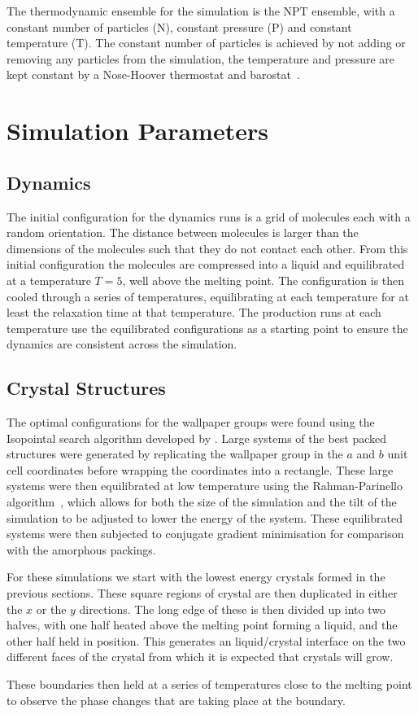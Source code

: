 The thermodynamic ensemble for the simulation is the NPT ensemble, with a constant number of particles (N), constant pressure (P) and constant temperature (T). The constant number of particles is achieved by not adding or removing any particles from the simulation, the temperature and pressure are kept constant by a Nose-Hoover thermostat and barostat~\cite{nose:84,hoover:85}.


\section{Simulation Parameters}

\subsection{Dynamics}

The initial configuration for the dynamics runs is a grid of molecules each with a random orientation. The distance between molecules is larger than the dimensions of the molecules such that they do not contact each other. From this initial configuration the molecules are compressed into a liquid and equilibrated at a temperature $T=5$, well above the melting point. The configuration is then cooled through a series of temperatures, equilibrating at each temperature for at least the relaxation time at that temperature. The production runs at each temperature use the equilibrated configurations as a starting point to ensure the dynamics are consistent across the simulation.

\subsection{Crystal Structures}

The optimal configurations for the wallpaper groups were found using the Isopointal search algorithm developed by \textcite{hudson:10}. Large systems of the best packed structures were generated by replicating the wallpaper group in the $a$ and $b$ unit cell coordinates before wrapping the coordinates into a rectangle. These large systems were then equilibrated at low temperature using the Rahman-Parinello algorithm~\tocite, \tofix{}which allows for both the size of the simulation and the tilt of the simulation to be adjusted to lower the energy of the system. These equilibrated systems were then subjected to conjugate gradient minimisation for comparison with the amorphous packings.

For these simulations we start with the lowest energy crystals formed in the previous sections. These square regions of crystal are then duplicated in either the $x$ or the $y$ directions. The long edge of these is then divided up into two halves, with one half heated above the melting point forming a liquid, and the other half held in position. This generates an liquid/crystal interface on the two different faces of the crystal from which it is expected that crystals will grow.

These boundaries then held at a series of temperatures close to the melting point to observe the phase changes that are taking place at the boundary.

